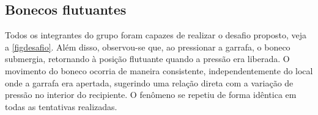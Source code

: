 \subsection{Bonecos flutuantes}

Todos os integrantes do grupo foram capazes de realizar o desafio proposto, veja
a \cref{figdesafio}. Além disso, observou-se que, ao pressionar a garrafa, o
boneco submergia, retornando à posição flutuante quando a pressão era liberada.
O movimento do boneco ocorria de maneira consistente, independentemente do local
onde a garrafa era apertada, sugerindo uma relação direta com a variação de
pressão no interior do recipiente. O fenômeno se repetiu de forma idêntica em
todas as tentativas realizadas.


